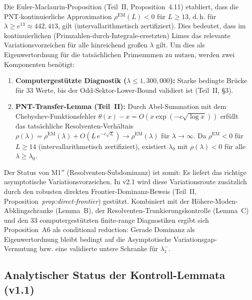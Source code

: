 \documentclass[12pt,a4paper]{article}
\theoremstyle{definition}
\theoremstyle{remark}
\begin{document}
Die Euler-Maclaurin-Proposition (Teil~II, Proposition~4.11) etabliert, dass die PNT-kontinuierliche Approximation $\rho^{\mathrm{EM}}(L) < 0$ für $L \geq 13$, d.\,h. für $\lambda \geq e^{13} \approx 442{,}413$, gilt (intervallarithmetisch zertifiziert). Dies bedeutet, dass im kontinuierlichen (Primzahlen-durch-Integrale-ersetzten) Limes das relevante Variationsvorzeichen für alle hinreichend großen $\lambda$ gilt. Um dies als Eigenwertordnung für die tatsächlichen Primsummen zu nutzen, werden zwei Komponenten benötigt:

\begin{enumerate}
  \item \textbf{Computergestützte Diagnostik ($\lambda \leq 1{,}300{,}000$):} Starke bedingte Brücke für $33$ Werte, bis der Odd-Sektor-Lower-Bound validiert ist (Teil~II, \S3).
  \item \textbf{PNT-Transfer-Lemma (Teil~II):} Durch Abel-Summation mit dem Chebyshev-Funktionsfehler $\theta(x) - x = O(x\exp(-c\sqrt{\log x}))$ erfüllt das tatsächliche Resolventen-Verhältnis $\rho(\lambda) = \rho^{\mathrm{EM}}(\lambda) + O(L\,e^{-c\sqrt{L}}) \to \rho^{\mathrm{EM}}(\lambda)$ für $\lambda \to \infty$. Da $\rho^{\mathrm{EM}} < 0$ für $L \geq 14$ (intervallarithmetisch zertifiziert), existiert $\lambda_0$ mit $\rho(\lambda) < 0$ für alle $\lambda \geq \lambda_0$.
\end{enumerate}

\noindent Der Status von M1$''$ (Resolventen-Subdominanz) ist somit: Es liefert das richtige asymptotische Variationsvorzeichen. In v2.1 wird diese Variationsroute zusätzlich durch den robusten direkten Frontier-Dominanz-Beweis (Teil~II, Proposition~\emph{prop:direct-frontier}) gestützt. Kombiniert mit der Höhere-Moden-Abklingschranke (Lemma~B), der Resolventen-Trunkierungskontrolle (Lemma~C) und den $33$ computergestützten finite-range Diagnostiken ergibt sich Proposition~A6 als conditional reduction: Gerade Dominanz als Eigenwertordnung bleibt bedingt auf die Asymptotische Variationsgap-Vermutung bzw. eine validierte untere Schranke für $\lambda_1^-$.

\subsection{Analytischer Status der Kontroll-Lemmata (v1.1)}
\end{document}
